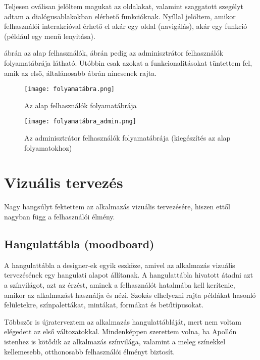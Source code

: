 \documentclass[a4paper,12pt]{report}
\begin{document}
Teljesen oválisan jelöltem magukat az oldalakat, valamint szaggatott szegélyt adtam a dialógusablakokban elérhető funkcióknak. Nyíllal jelöltem, amikor felhasználói interakcióval érhető el akár egy oldal (navigálás), akár egy funkció (például egy menü lenyitása).

 ábrán az alap felhasználók,  ábrán pedig az adminisztrátor felhasználók folyamatábrája látható. Utóbbin csak azokat a funkcionalitásokat tüntettem fel, amik az első, általánosabb ábrán nincsenek rajta.

\begin{figure}
    \centering
    \texttt{[image: folyamatábra.png]}
    \caption{Az alap felhasználók folyamatábrája \cite{drawio}}
    \label{fig:UserFlowchart}
\end{figure}

\begin{figure}
    \centering
    \texttt{[image: folyamatábra\_admin.png]}
    \caption{Az adminisztrátor felhasználók folyamatábrája (kiegészítés az alap folyamatokhoz)}
    \label{fig:AdminFlowchart}
\end{figure}

\section{Vizuális tervezés}

Nagy hangsúlyt fektettem az alkalmazás vizuális tervezésére, hiszen ettől nagyban függ a felhasználói élmény.

\subsection{Hangulattábla (moodboard)}

A hangulattábla \cite{figma-moodboard} a designer-ek egyik eszköze, amivel az alkalmazás vizuális tervezésének egy hangulati alapot állítanak. A hangulattábla hivatott átadni azt a színvilágot, azt az érzést, aminek a felhasználót hatalmába kell kerítenie, amikor az alkalmazást használja és nézi. Szokás elhelyezni rajta példákat hasonló felületekre, színpalettákat, mintákat, formákat és betűtípusokat.

Többször is újraterveztem az alkalmazás hangulattábláját, mert nem voltam elégedett az első változatokkal. Mindenképpen szerettem volna, ha Apollón istenhez is kötődik az alkalmazás színvilága, valamint a meleg színekkel kellemesebb, otthonosabb felhasználói élményt biztosít.
\end{document}

